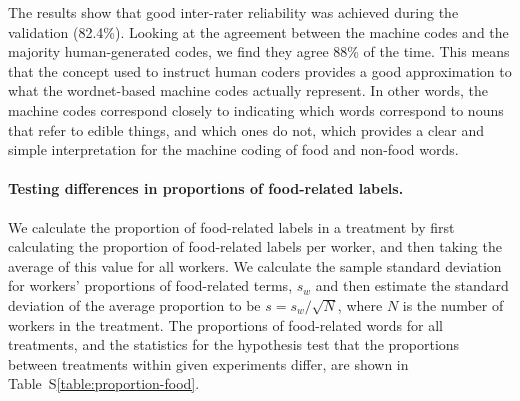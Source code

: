 \documentclass[12pt]{article}
\begin{document}
The results show that good inter-rater reliability was achieved during the
validation (82.4\%).  Looking at the agreement between the 
machine codes and the majority human-generated codes, we find they agree
88\% of the time.  This means that the concept used to instruct human coders
provides a good approximation to what the wordnet-based machine codes actually
represent. In other words, the machine codes correspond closely to indicating
which words correspond to nouns that refer to edible things, and which ones
do not, which provides a clear and simple interpretation for the machine
coding of food and non-food words.

\paragraph{Testing differences in proportions of food-related labels.}
We calculate the proportion of food-related labels in a treatment by first
calculating the proportion of food-related labels per worker, and then
taking the average of this value for all workers.  We calculate the
sample standard deviation for workers' proportions of food-related terms,
$s_w$ and then estimate the standard deviation of the average proportion
to be $s = s_w / \sqrt{N}$, where $N$ is the number of workers in the 
treatment.  The proportions of food-related words for all treatments,
and the statistics for the hypothesis test that the proportions between
treatments within given experiments differ, are shown in 
Table~S\ref{table:proportion-food}.
\end{document}
